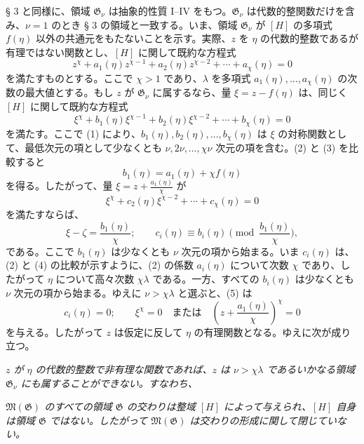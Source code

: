 § 3 と同様に、領域 $\mathfrak G_\nu$ は抽象的性質 I--IV をもつ。$\mathfrak G_\nu$ は代数的整関数だけを含み、$\nu=1$ のとき § 3 の領域と一致する。いま、領域 $\mathfrak G_\nu$ が $[H]$ の多項式 $f(\eta)$ 以外の共通元をもたないことを示す。実際、$z$ を $\eta$ の代数的整数であるが有理ではない関数とし、$[H]$ に関して既約な方程式
\begin{equation}
z^\chi+a_1(\eta)z^{\chi-1}+a_2(\eta)z^{\chi-2}+\cdots+a_\chi(\eta)=0
\tag{2}
\end{equation}
を満たすものとする。ここで $\chi>1$ であり、$\lambda$ を多項式 $a_1(\eta),\ldots,a_\chi(\eta)$ の次数の最大値とする。もし $z$ が $\mathfrak G_\nu$ に属するなら、量 $\xi=z-f(\eta)$ は、同じく $[H]$ に関して既約な方程式
\begin{equation}
\xi^\chi+b_1(\eta)\xi^{\chi-1}+b_2(\eta)\xi^{\chi-2}+\cdots+b_\chi(\eta)=0
\tag{3}
\end{equation}
を満たす。ここで (1) により、$b_1(\eta),b_2(\eta),\ldots,b_\chi(\eta)$ は $\xi$ の対称関数として、最低次元の項として少なくとも $\nu,2\nu,\ldots,\chi\nu$ 次元の項を含む。(2) と (3) を比較すると
\[
 b_1(\eta)=a_1(\eta)+\chi f(\eta)
\]
を得る。したがって、量 $\xi=z+\frac{a_1(\eta)}{\chi}$ が
\begin{equation}
\xi^\chi+c_2(\eta)\xi^{\chi-2}+\cdots+c_\chi(\eta)=0
\tag{4}
\end{equation}
を満たすならば、
\begin{equation}
 \xi-\zeta=\frac{b_1(\eta)}{\chi};
 \qquad
 c_i(\eta)\equiv b_i(\eta)\pmod{\frac{b_1(\eta)}{\chi}},
\tag{5}
\end{equation}
である。ここで $b_1(\eta)$ は少なくとも $\nu$ 次元の項から始まる。いま $c_i(\eta)$ は、(2) と (4) の比較が示すように、(2) の係数 $a_i(\eta)$ について次数 $\chi$ であり、したがって $\eta$ について高々次数 $\chi\lambda$ である。一方、すべての $b_i(\eta)$ は少なくとも $\nu$ 次元の項から始まる。ゆえに $\nu>\chi\lambda$ と選ぶと、(5) は
\[
 c_i(\eta)=0;\qquad
 \xi^\chi=0\quad\text{または}\quad
 \left(z+\frac{a_1(\eta)}{\chi}\right)^\chi=0
\]
を与える。したがって $z$ は仮定に反して $\eta$ の有理関数となる。ゆえに次が成り立つ。

\emph{$z$ が $\eta$ の代数的整数で非有理な関数であれば、$z$ は $\nu>\chi\lambda$ であるいかなる領域 $\mathfrak G_\nu$ にも属することができない。すなわち、}

\emph{$\mathfrak M(\mathfrak G)$ のすべての領域 $\mathfrak G$ の交わりは整域 $[H]$ によって与えられ、$[H]$ 自身は領域 $\mathfrak G$ ではない。したがって $\mathfrak M(\mathfrak G)$ は交わりの形成に関して閉じていない。}

